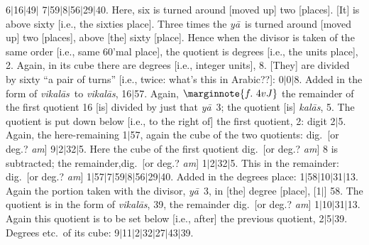 \documentclass[11pt,a5paper]{book}
\def\kalas{\textit{ka\-l\=as}}
\def\ya{\textit{y\=a}}
\def\vikalas{\textit{vi\-ka\-l\=as}}
\def\danda{$|$}
\begin{document}
6\danda 16\danda 49\danda
7\danda 59\danda 8\danda 56\danda 29\danda 40. Here, six is turned around
[moved up] two [places]. [It] is above sixty [i.e., the sixties place]. 
Three times the \ya\ is turned around [moved up] two [places], above [the] sixty [place]. 
Hence when the divisor is taken of the same order [i.e., same 60'mal place],
the quotient is degrees [i.e., the
units place], 2.
Again, in its cube there are degrees [i.e., integer units], 8.
[They] are divided by sixty ``a pair of turns'' [i.e., twice: what's this in Arabic??]:
0\danda 0\danda 8. Added in the form of \vikalas\ to \vikalas,
16\danda 57.
Again,
$\marginnote{f.~4v J}$
the remainder of the first quotient 16 [is] divided by just that \ya\ 3; the quotient [is] \kalas, 5.
The quotient is put down below [i.e., to the right of] the first quotient, 2: digit 2\danda 5.
Again, the here-remaining 1\danda 57, again the cube of the two quotients: dig.\ [or deg.? \textit{a\*m}]
9\danda 2\danda 32\danda 5.  Here the cube of the first quotient  dig.\ [or deg.? \textit{a\*m}]
8 is subtracted; the remainder,dig.\ [or deg.? \textit{a\*m}]
1\danda 2\danda 32\danda 5. This in the remainder: dig.\ [or deg.? \textit{a\*m}]
1\danda 57\danda 7\danda 59\danda 8\danda 56\danda 29\danda 40. 
Added in the degrees place: 
1\danda 58\danda 10\danda 31\danda 13.
Again the portion taken with the divisor, \ya\ 3, in [the] degree [place], [1\danda] 58.
The quotient is in the form of \vikalas,
39, the remainder dig.\ [or deg.? \textit{a\*m}] 
1\danda 10\danda 31\danda 13. Again this quotient is to be set below [i.e., after] the 
previous quotient, 2\danda 5\danda 39.
Degrees etc.\ of its cube: 9\danda 11\danda 2\danda 32\danda 27\danda 43\danda 39.
\end{document}
